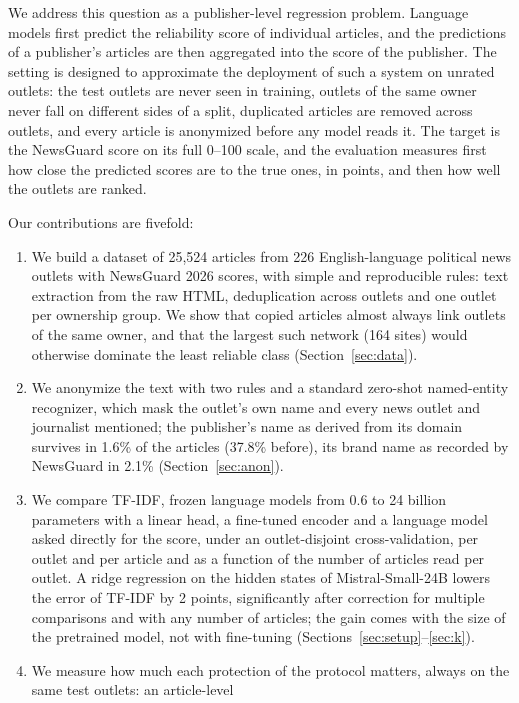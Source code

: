 \documentclass[11pt,a4paper]{article}
\begin{document}
We address this question as a publisher-level regression problem. Language models first predict the reliability score
of individual articles, and the predictions of a publisher's articles are then aggregated into the score of the
publisher. The setting is designed to approximate the deployment of such a system on unrated outlets: the test outlets
are never seen in training, outlets of the same owner never fall on different sides of a split, duplicated articles
are removed across outlets, and every article is anonymized before any model reads it. The target is the NewsGuard
score on its full 0--100 scale, and the evaluation measures first how close the predicted scores are to the true ones,
in points, and then how well the outlets are ranked.

Our contributions are fivefold:
\begin{enumerate}
  \item We build a dataset of 25,524 articles from 226 English-language political news outlets with NewsGuard 2026
        scores, with simple and reproducible rules: text extraction from the raw HTML, deduplication across outlets
        and one outlet per ownership group. We show that copied articles almost always link outlets of the same owner,
        and that the largest such network (164 sites) would otherwise dominate the least reliable class
        (Section~\ref{sec:data}).
  \item We anonymize the text with two rules and a standard zero-shot named-entity recognizer, which mask the outlet's
        own name and every news outlet and journalist mentioned; the publisher's name as derived from its domain survives in
        1.6\% of the articles (37.8\% before), its brand name as recorded by NewsGuard in 2.1\% (Section~\ref{sec:anon}).
  \item We compare TF-IDF, frozen language models from 0.6 to 24 billion parameters with a linear head, a fine-tuned
        encoder and a language model asked directly for the score, under an outlet-disjoint cross-validation, per
        outlet and per article and as a function of the number of articles read per outlet. A ridge regression on the
        hidden states of Mistral-Small-24B lowers the error of TF-IDF by 2 points, significantly after correction for
        multiple comparisons and with any number of articles; the gain comes with the size of the pretrained model,
        not with fine-tuning (Sections~\ref{sec:setup}--\ref{sec:k}).
  \item We measure how much each protection of the protocol matters, always on the same test outlets: an article-level

\end{enumerate}
\end{document}
